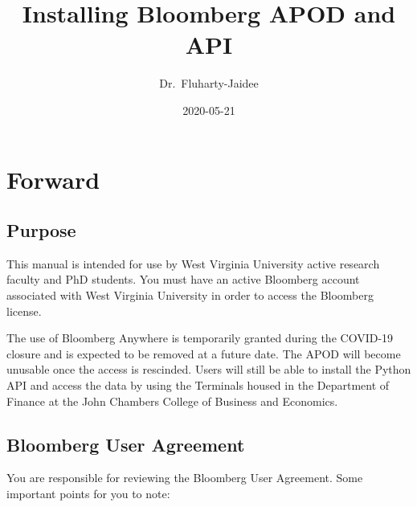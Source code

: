 \documentclass[]{book}
\title{Installing Bloomberg APOD and API}
\author{Dr.~Fluharty-Jaidee}
\date{2020-05-21}
\begin{document}
\maketitle

{
\setcounter{tocdepth}{1}
\tableofcontents
}
\chapter{Forward}\label{forward}

\section{Purpose}\label{purpose}

This manual is intended for use by West Virginia University active
research faculty and PhD students. You must have an active Bloomberg
account associated with West Virginia University in order to access the
Bloomberg license.

The use of Bloomberg Anywhere is temporarily granted during the COVID-19
closure and is expected to be removed at a future date. The APOD will
become unusable once the access is rescinded. Users will still be able
to install the Python API and access the data by using the Terminals
housed in the Department of Finance at the John Chambers College of
Business and Economics.

\section{Bloomberg User Agreement}\label{bloomberg-user-agreement}

You are responsible for reviewing the Bloomberg User Agreement. Some
important points for you to note:
\end{document}
